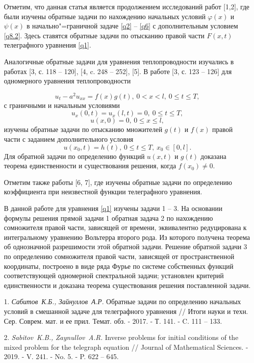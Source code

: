 Отметим, что данная статья является продолжением исследований работ [1,2], где были изучены обратные задачи по нахождению начальных условий $\varphi(x)$ и $\psi(x)$ в начально"=граничной задаче \eqref{q2} -- \eqref{q6} с дополнительным условием \eqref{q8.2}. Здесь ставятся обратные задачи по отысканию правой части $F(x,t)$ телеграфного уравнения \eqref{q1}.

Аналогичные обратные задачи для уравнения теплопроводности изучались в работах [3, с. 118 -- 120], [4, c. 248 -- 252], [5]. В работе [3, с. 123 -- 126] для одномерного уравнения теплопроводности

$$u_t-a^2u_{xx}=f(x)g(t),\ 0<x<l,\ 0\leqslant t\leqslant T,$$
с граничными и начальным условиями
$$u_x(0,t)=u_x(l,t)=0,\ 0\leqslant t\leqslant T,$$
$$u(x,0)=0,\ 0\leqslant x\leqslant l,$$
изучены обратные задачи по отысканию множителей $g(t)$ и $f(x)$ правой части с заданием дополнительного условия
\begin{equation}\label{aa1}u(x_0,t)=h(t),\ 0\leqslant t\leqslant T,\ x_0\in[0,l].\end{equation}
Для обратной задачи по определению функций $u(x,t)$ и $g(t)$ доказана теорема единственности и существования решения, когда $f(x_0)\not=0$.

Отметим также работы [6, 7], где изучены обратные задачи по определению коэффициента при неизвестной функции телеграфного уравнения.

В данной работе для уравнения \eqref{q1} изучены задачи 1 -- 3. На основании формулы решения прямой задачи 1 обратная задача 2 по нахождению сомножителя правой части, зависящей от
времени, эквивалентно редуцирована к интегральному уравнению Вольтерра второго рода. Из которого получена
теорема об однозначной разрешимости этой обратной задачи. Решение обратной задачи 3 по
определению сомножителя правой части, зависящей от пространственной координаты,
построено в виде ряда Фурье по системе собственных функций соответствующей одномерной спектральной задачи; установлен критерий единственности и доказана теорема существования решения поставленной задачи.


\litlist

1. {\it Сабитов~К.Б., Зайнуллов~А.Р.}
 Обратные задачи по определению начальных условий в смешанной задаче для телеграфного уравнения // Итоги науки и техн. Сер. Соврем. мат. и ее прил. Темат. обз. - 2017. - Т. 141. - C. 111 -- 133.

2. {\it Sabitov~K.B., Zaynullov~A.R.} Inverse problems for initial conditions of the mixed problem
 for the telegraph equation // Journal of Mathematical Sciences. - 2019. - V. 241. - No. 5. - P. 622 -- 645.

